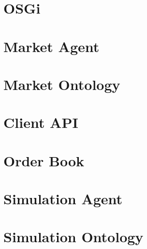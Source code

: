 \section{OSGi}

\section{Market Agent}

\section{Market Ontology}

\section{Client API}

\section{Order Book}

\section{Simulation Agent}

\section{Simulation Ontology}